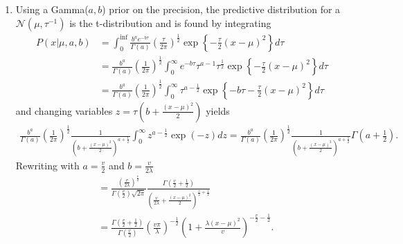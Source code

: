 \documentclass[]{article}
\begin{document}
\begin{enumerate}
\begin{align*}
	& \hspace{1.5cm} \text{finally, completing the square yields} \\
	 &\propto \exp \Bigg(\bm{\mu} - (N\bm{\Sigma}^{-1}\mathbf{\bar{x}} + \bm{\Sigma}^{-1}_0 \bm{\mu_0})(N\bm{\Sigma}^{-1} + \bm{\Sigma}^{-1}_0)^{-1}\Bigg)^T(N\bm{\Sigma}^{-1} + \bm{\Sigma}^{-1}_0)\Bigg(\bm{\mu} - (N\bm{\Sigma}^{-1}\mathbf{\bar{x}} + \bm{\Sigma}^{-1}_0 \bm{\mu_0})(N\bm{\Sigma}^{-1} + \bm{\Sigma}^{-1}_0)^{-1}\Bigg)
	\end{align*}
	implying that the posterior, $\bm{\mu}  \sim \mathcal{N}(N\bm{\Sigma}^{-1}\mathbf{\bar{x}} + \bm{\Sigma}^{-1}_0 \bm{\mu_0}, (N\bm{\Sigma}^{-1} + \bm{\Sigma}^{-1}_0)^{-1})$.
	\item[2.46] Using a Gamma($a,b$) prior on the precision, the predictive distribution for a $\mathcal{N}(\mu, \tau^{-1})$ is the t-distribution and is found by integrating
	\begin{align*}
	P(x | \mu, a, b) &= \int_{0}^{\inf} \frac{b^ae^{-b \tau}}{\Gamma(a)}\left(\frac{\tau}{2 \pi}\right)^\frac{1}{2} \exp \left\{-\frac{\tau}{2}(x - \mu)^2\right\} d \tau \\
	&=\frac{b^a}{\Gamma(a)}\left(\frac{1}{2 \pi}\right)^\frac{1}{2} \int_{0}^{\infty}e^{-b \tau}\tau^{a-1}\tau^\frac{1}{2} \exp \left\{-\frac{\tau}{2}(x - \mu)^2\right\} d \tau \\
	&= \frac{b^a}{\Gamma(a)}\left(\frac{1}{2 \pi}\right)^\frac{1}{2} \int_{0}^{\infty} \tau^{a - \frac{1}{2}} \exp \left\{ -b \tau  -\frac{\tau}{2}(x - \mu)^2 \right\} d \tau
	\end{align*}
	and changing variables $z = \tau (b + \frac{(x - \mu)^2}{2})$ yields
	\begin{align*}
	\frac{b^a}{\Gamma(a)}\left(\frac{1}{2 \pi}\right)^\frac{1}{2} \frac{1}{\left( b + \frac{(x - \mu)^2}{2} \right)^{a + \frac{1}{2}}} \int_{0}^{\infty} z^{a - \frac{1}{2}} \exp (-z) dz = \frac{b^a}{\Gamma(a)}\left(\frac{1}{2 \pi}\right)^\frac{1}{2} \frac{1}{\left( b + \frac{(x - \mu)^2}{2} \right)^{a + \frac{1}{2}}} \Gamma\left(a + \frac{1}{2}\right).
	\end{align*}
	Rewriting with $a = \frac{v}{2}$ and $b = \frac{v}{2 \lambda}$
	\begin{align*}
	&= \frac{\left( \frac{v}{2 \lambda} \right)^{\frac{v}{2}}}{\Gamma \left( \frac{v}{2}  \right) \sqrt{2 \pi}} \frac{\Gamma \left(\frac{v}{2} + \frac{1}{2}\right)}{\left(\frac{v}{2 \lambda} + \frac{(x - \mu)^2}{2}\right)^{\frac{v}{2} + \frac{1}{2}}} \\
	&= \frac{\Gamma\left( \frac{v}{2} + \frac{1}{2} \right)}{\Gamma \left(\frac{v}{2}\right)} \left(\frac{v \pi}{\lambda}\right)^{-\frac{1}{2}}\left(1 + \frac{\lambda ( x - \mu)^2}{v}\right)^{- \frac{v}{2} - \frac{1}{2} }.

\end{align*}
\end{enumerate}
\end{document}
